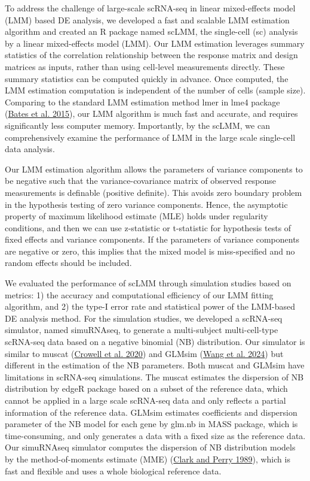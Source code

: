 \documentclass[
]{article}
\begin{document}
To address the challenge of large-scale scRNA-seq in linear
mixed-effects model (LMM) based DE analysis, we developed a fast and
scalable LMM estimation algorithm and created an R package named scLMM,
the single-cell (sc) analysis by a linear mixed-effects model (LMM). Our
LMM estimation leverages summary statistics of the correlation
relationship between the response matrix and design matrices as inputs,
rather than using cell-level measurements directly. These summary
statistics can be computed quickly in advance. Once computed, the LMM
estimation computation is independent of the number of cells (sample
size). Comparing to the standard LMM estimation method lmer in lme4
package (\protect\hyperlink{ref-lme4}{Bates et al. 2015}), our LMM
algorithm is much fast and accurate, and requires significantly less
computer memory. Importantly, by the scLMM, we can comprehensively
examine the performance of LMM in the large scale single-cell data
analysis.

Our LMM estimation algorithm allows the parameters of variance
components to be negative such that the variance-covariance matrix of
observed response measurements is definable (positive definite). This
avoids zero boundary problem in the hypothesis testing of zero variance
components. Hence, the asymptotic property of maximum likelihood
estimate (MLE) holds under regularity conditions, and then we can use
z-statistic or t-statistic for hypothesis tests of fixed effects and
variance components. If the parameters of variance components are
negative or zero, this implies that the mixed model is miss-specified
and no random effects should be included.

We evaluated the performance of scLMM through simulation studies based
on metrics: 1) the accuracy and computational efficiency of our LMM
fitting algorithm, and 2) the type-I error rate and statistical power of
the LMM-based DE analysis method. For the simulation studies, we
developed a scRNA-seq simulator, named simuRNAseq, to generate a
multi-subject multi-cell-type scRNA-seq data based on a negative
binomial (NB) distribution. Our simulator is similar to muscat
(\protect\hyperlink{ref-muscat2020}{Crowell et al. 2020}) and GLMsim
(\protect\hyperlink{ref-GLMsim2024}{Wang et al. 2024}) but different in
the estimation of the NB parameters. Both muscat and GLMsim have
limitations in scRNA-seq simulations. The muscat estimates the
dispersion of NB distribution by edgeR package based on a subset of the
reference data, which cannot be applied in a large scale scRNA-seq data
and only reflects a partial information of the reference data. GLMsim
estimates coefficients and dispersion parameter of the NB model for each
gene by glm.nb in MASS package, which is time-consuming, and only
generates a data with a fixed size as the reference data. Our simuRNAseq
simulator computes the dispersion of NB distribution models by the
method-of-moments estimate (MME)
(\protect\hyperlink{ref-Clark1989}{Clark and Perry 1989}), which is fast
and flexible and uses a whole biological reference data.
\end{document}
